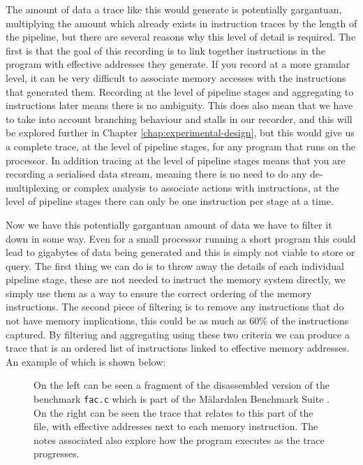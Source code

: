 The amount of data a trace like this would generate is potentially gargantuan, multiplying the amount which already exists in instruction traces by the length of the pipeline, but there are several reasons why this level of detail is required. The first is that the goal of this recording is to link together instructions in the program with effective addresses they generate. If you record at a more granular level, it can be very difficult to associate memory accesses with the instructions that generated them. Recording at the level of pipeline stages and aggregating to instructions later means there is no ambiguity. This does also mean that we have to take into account branching behaviour and stalls in our recorder, and this will be explored further in Chapter \ref{chap:experimental-design}, but this would give us a complete trace, at the level of pipeline stages, for any program that runs on the processor. In addition tracing at the level of pipeline stages means that you are recording a serialised data stream, meaning there is no need to do any de-multiplexing or complex analysis to associate actions with instructions, at the level of pipeline stages there can only be one instruction per stage at a time. 

Now we have this potentially gargantuan amount of data we have to filter it down in some way. Even for a small processor running a short program this could lead to gigabytes of data being generated and this is simply not viable to store or query. The first thing we can do is to throw away the details of each individual pipeline stage, these are not needed to instruct the memory system directly, we simply use them as a way to ensure the correct ordering of the memory instructions. The second piece of filtering is to remove any instructions that do not have memory implications, this could be as much as 60\% of the instructions captured. By filtering and aggregating using these two criteria we can produce a trace that is an ordered list of instructions linked to effective memory addresses. An example of which is shown below:

\begin{figure}
	
	\caption{On the left can be seen a fragment of the disassembled version of the benchmark \texttt{fac.c} which is part of the Mälardalen Benchmark Suite \cite{gustafssonMalardalenWCETBenchmarks2010}. On the right can be seen the trace that relates to this part of the file, with effective addresses next to each memory instruction. The notes associated also explore how the program executes as the trace progresses.}
\end{figure}


